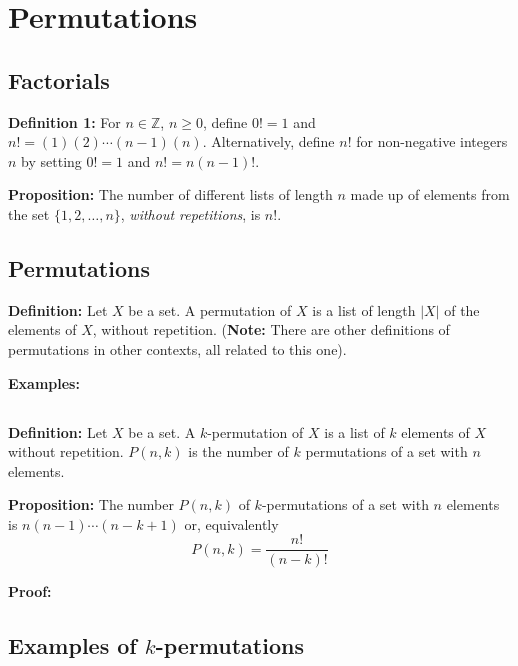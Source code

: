 \documentclass[
]{article}
\author{}
\date{}
\begin{document}
\hypertarget{permutations}{%
\section{Permutations}\label{permutations}}

\hypertarget{factorials}{%
\subsection{Factorials}\label{factorials}}

\textbf{Definition 1:} For \(n\in\mathbb{Z}\), \(n \ge 0\), define
\(0!=1\) and \(n!=(1)(2)\cdots(n-1)(n)\). Alternatively, define \(n!\)
for non-negative integers \(n\) by setting \(0!=1\) and \(n!=n(n-1)!\).

\textbf{Proposition:} The number of different lists of length \(n\) made
up of elements from the set \(\{1,2,\ldots, n\}\), \emph{without
repetitions}, is \(n!\).

\vfill\eject

\hypertarget{permutations-1}{%
\subsection{Permutations}\label{permutations-1}}

\textbf{Definition:} Let \(X\) be a set. A permutation of \(X\) is a
list of length \(|X|\) of the elements of \(X\), without repetition.
(\textbf{Note:} There are other definitions of permutations in other
contexts, all related to this one).

\textbf{Examples:}

\vfill\eject

\hypertarget{section}{%
\subsection{}\label{section}}

\textbf{Definition:} Let \(X\) be a set. A \(k\)-permutation of \(X\) is
a list of \(k\) elements of \(X\) without repetition. \(P(n,k)\) is the
number of \(k\) permutations of a set with \(n\) elements.

\textbf{Proposition:} The number \(P(n,k)\) of \(k\)-permutations of a
set with \(n\) elements is \(n(n-1)\cdots (n-k+1)\) or, equivalently \[
P(n,k) = \frac{n!}{(n-k)!}
\]

\textbf{Proof:}

\vfill\eject

\hypertarget{examples-of-k-permutations}{%
\subsection{\texorpdfstring{Examples of
\(k\)-permutations}{Examples of k-permutations}}\label{examples-of-k-permutations}}
\end{document}
